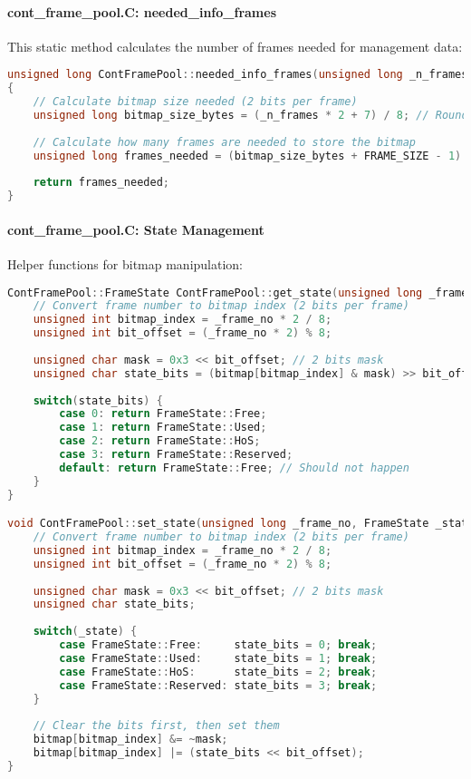 \documentclass{article}
\begin{document}
\paragraph{cont\_frame\_pool.C: needed\_info\_frames} This static method calculates the number of frames needed for management data:

\begin{lstlisting}[language=C++, caption=Info Frames Calculation]
unsigned long ContFramePool::needed_info_frames(unsigned long _n_frames)
{
    // Calculate bitmap size needed (2 bits per frame)
    unsigned long bitmap_size_bytes = (_n_frames * 2 + 7) / 8; // Round up to nearest byte
    
    // Calculate how many frames are needed to store the bitmap
    unsigned long frames_needed = (bitmap_size_bytes + FRAME_SIZE - 1) / FRAME_SIZE; // Round up
    
    return frames_needed;
}
\end{lstlisting}

\paragraph{cont\_frame\_pool.C: State Management} Helper functions for bitmap manipulation:

\begin{lstlisting}[language=C++, caption=State Management Functions]
ContFramePool::FrameState ContFramePool::get_state(unsigned long _frame_no) {
    // Convert frame number to bitmap index (2 bits per frame)
    unsigned int bitmap_index = _frame_no * 2 / 8;
    unsigned int bit_offset = (_frame_no * 2) % 8;
    
    unsigned char mask = 0x3 << bit_offset; // 2 bits mask
    unsigned char state_bits = (bitmap[bitmap_index] & mask) >> bit_offset;
    
    switch(state_bits) {
        case 0: return FrameState::Free;
        case 1: return FrameState::Used;
        case 2: return FrameState::HoS;
        case 3: return FrameState::Reserved;
        default: return FrameState::Free; // Should not happen
    }
}

void ContFramePool::set_state(unsigned long _frame_no, FrameState _state) {
    // Convert frame number to bitmap index (2 bits per frame)
    unsigned int bitmap_index = _frame_no * 2 / 8;
    unsigned int bit_offset = (_frame_no * 2) % 8;
    
    unsigned char mask = 0x3 << bit_offset; // 2 bits mask
    unsigned char state_bits;
    
    switch(_state) {
        case FrameState::Free:     state_bits = 0; break;
        case FrameState::Used:     state_bits = 1; break;
        case FrameState::HoS:      state_bits = 2; break;
        case FrameState::Reserved: state_bits = 3; break;
    }
    
    // Clear the bits first, then set them
    bitmap[bitmap_index] &= ~mask;
    bitmap[bitmap_index] |= (state_bits << bit_offset);
}
\end{lstlisting}
\end{document}
